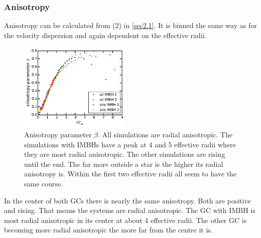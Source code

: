\subsubsection{Anisotropy}
Anisotropy can be calculated from (2) in \ref{sec2.1}. It is binned the same way as for the velocity dispersion and again dependent on the effective radii.
\begin{figure}
	\centering
	\includegraphics[width=0.475\textwidth]{Plots/anisotropy_parameter_beta.pdf}
	\caption{Anisotropy parameter \(\beta\). All simulations are radial anisotropic. The simulations with \acp{IMBH} have a peak at 4 and 5 effective radii where they are most radial anisotropic. The other simulations are rising until the end. The far more outside a star is the higher its radial anisotropy is. Within the first two effective radii all seem to have the same course.}
	\label{fig:anisotropy_param}
\end{figure}
In the center of both \acp{GC} there is nearly the same anisotropy. Both are positive and rising. That means the systems are radial anisotropic. The \ac{GC} with \ac{IMBH} is most radial anisotropic in its center at about 4 effective radii. The other \ac{GC} is becoming more radial anisotropic the more far from the centre it is.

